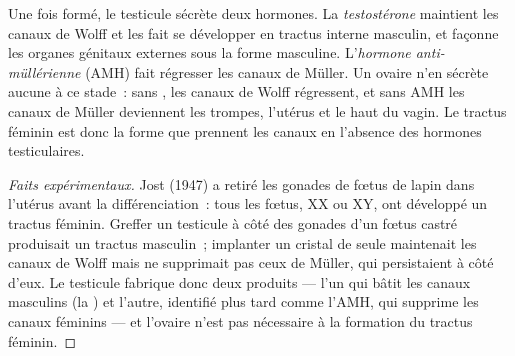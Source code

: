 \begin{proposition}\label{prop:g11:becoming-male-female:hormones}
Une fois formé, le testicule sécrète deux hormones. La
\emph{testostérone} maintient les canaux de Wolff
et les fait se développer en tractus interne masculin, et façonne les
organes génitaux externes sous la forme masculine. L'\emph{hormone
anti-müllérienne} (AMH) fait régresser les canaux de Müller. Un ovaire
n'en sécrète aucune à ce stade~: sans , les canaux de Wolff
régressent, et sans AMH les canaux de Müller deviennent les trompes,
l'utérus et le haut du vagin. Le tractus féminin est donc la forme que
prennent les canaux en l'absence des hormones testiculaires.
\end{proposition}
\begin{proof}[Faits expérimentaux]
Jost (1947) a retiré les gonades de fœtus de lapin dans l'utérus
avant la différenciation~: tous les fœtus, XX ou XY, ont développé
un tractus féminin. Greffer un testicule à côté des gonades d'un
fœtus castré produisait un tractus masculin~; implanter un cristal
de  seule maintenait les canaux de Wolff mais ne
supprimait pas ceux de Müller, qui persistaient à côté d'eux. Le
testicule fabrique donc deux produits --- l'un qui bâtit les canaux
masculins (la ) et l'autre, identifié plus tard comme
l'AMH, qui supprime les canaux féminins --- et l'ovaire n'est pas
nécessaire à la formation du tractus féminin.
\end{proof}

